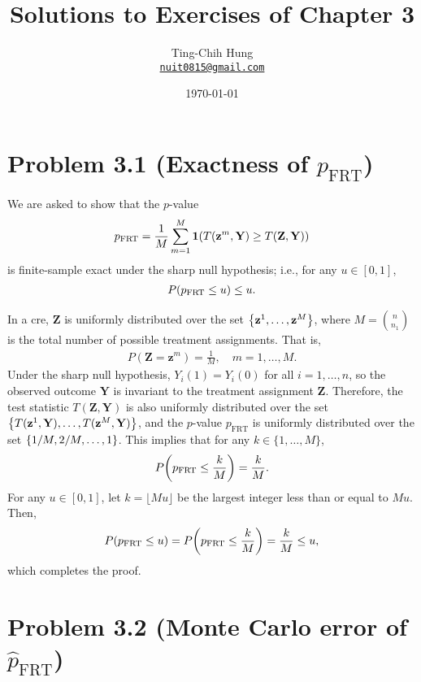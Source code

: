 \documentclass[10pt]{article}
\title{Solutions to Exercises of Chapter 3}
\author{Ting-Chih Hung \\ \href{mailto:nuit0815@gmail.com}{\texttt{nuit0815@gmail.com}}}
\date{\today}
\begin{document}
\maketitle


\section*{Problem 3.1 (Exactness of $p_{\mathrm{FRT}}$)}

We are asked to show that the $p$-value 
\begin{align*}
  p_{\mathrm{FRT}} 
  = \frac{1}{M} \sum_{m=1}^M 
  \mathbf{1}{\left( T{\left( \mathbf{z}^{m}, \mathbf{Y} \right)} \geq T{\left( \mathbf{Z}, \mathbf{Y} \right)} \right)}
\end{align*}
is finite-sample exact under the sharp null hypothesis; i.e., for any $u \in [0, 1]$,
\begin{align*}
  P{\left( p_{\mathrm{FRT}} \leq u \right)} \leq u.
\end{align*}

In a \gls{cre},
$\mathbf{Z}$ is uniformly distributed over 
the set ${\left\lbrace \mathbf{z}^1, \ldots, \mathbf{z}^M \right\rbrace}$,
where $M = \binom{n}{n_1}$ is the total number of possible treatment assignments.
That is,
\begin{align*}
  P(\mathbf{Z} = \mathbf{z}^m) = \frac{1}{M}, \quad m = 1, \ldots, M.
\end{align*}
Under the sharp null hypothesis,
$Y_i(1) = Y_i(0)$ for all $i = 1, \ldots, n$,
so the observed outcome $\mathbf{Y}$ is invariant to the treatment assignment $\mathbf{Z}$.
Therefore, the test statistic $T(\mathbf{Z}, \mathbf{Y})$ is also uniformly distributed over
the set ${\left\lbrace T(\mathbf{z}^1, \mathbf{Y}), \ldots, T(\mathbf{z}^M, \mathbf{Y}) \right\rbrace}$,
and the $p$-value $p_{\mathrm{FRT}}$ is uniformly distributed over
the set ${\left\lbrace 1/M, 2/M, \ldots, 1 \right\rbrace}$.
This implies that for any $k \in \{1, \ldots, M\}$,
\begin{align*}
  P{\left( p_{\mathrm{FRT}} \leq \frac{k}{M} \right)}
  = \frac{k}{M}.
\end{align*}
For any $u \in [0, 1]$,
let $k = \lfloor Mu \rfloor$ be the largest integer less than or equal to $Mu$.
Then,
\begin{align*}
  P{\left( p_{\mathrm{FRT}} \leq u \right)}
  = P{\left( p_{\mathrm{FRT}} \leq \frac{k}{M} \right)}
  = \frac{k}{M} \leq u,
\end{align*}
which completes the proof.

\section*{Problem 3.2 (Monte Carlo error of $\hat{p}_{\mathrm{FRT}}$)}
\end{document}

